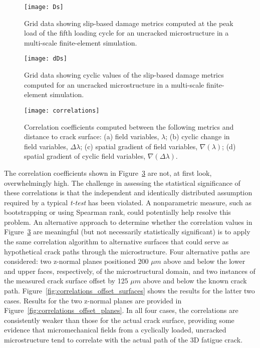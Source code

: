 {\begin{figure}[H]
  \centering
    \texttt{[image: Ds]}
    \caption{Grid data showing slip-based damage metrics computed at the peak load of the fifth loading cycle for an uncracked microstructure in a multi-scale finite-element simulation.}
    \label{fig:Ds}
\end{figure}

\begin{figure}[H]
  \centering
    \texttt{[image: dDs]}
    \caption{Grid data showing cyclic values of the slip-based damage metrics computed for an uncracked microstructure in a multi-scale finite-element simulation.}
    \label{fig:dDs}
\end{figure}

\begin{figure}[H]
  \centering
    \texttt{[image: correlations]}
    \caption{Correlation coefficients computed between the following metrics and distance to crack surface: (a) field variables, $\lambda$; (b) cyclic change in field variables, $\Delta\lambda$; (c) spatial gradient of field variables, $\nabla(\lambda)$; (d) spatial gradient of cyclic field variables, $\nabla(\Delta\lambda)$.}
    \label{fig:correlations}
\end{figure}
}%

The correlation coefficients shown in Figure~\ref{fig:correlations} are not, at first look, overwhelmingly high. The challenge in assessing the statistical significance of these correlations is that the independent and identically distributed assumption required by a typical \textit{t-test} has been violated. A nonparametric measure, such as bootstrapping \cite{good2010} or using Spearman rank, could potentially help resolve this problem. An alternative approach to determine whether the correlation values in Figure~\ref{fig:correlations} are meaningful (but not necessarily statistically significant) is to apply the same correlation algorithm to alternative surfaces that could serve as hypothetical crack paths through the microstructure. Four alternative paths are considered: two z-normal planes positioned 200 $\mu m$ above and below the lower and upper faces, respectively, of the microstructural domain, and two instances of the measured crack surface offset by 125 $\mu m$ above and below the known crack path. Figure~\ref{fig:correlations_offset_surfaces} shows the results for the latter two cases. Results for the two z-normal planes are provided in Figure~\ref{fig:correlations_offset_planes}. In all four cases, the correlations are consistently weaker than those for the actual crack surface, providing some evidence that micromechanical fields from a cyclically loaded, uncracked microstructure tend to correlate with the actual path of the 3D fatigue crack.

